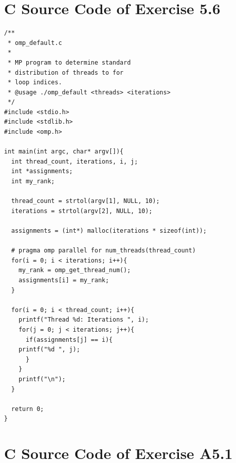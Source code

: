 \documentclass[a4paper,11pt,twoside]{article}
\begin{document}
\appendix

\section{C Source Code of Exercise 5.6}{\label{app:default}}
\begin{verbatim}
/**
 * omp_default.c
 * 
 * MP program to determine standard 
 * distribution of threads to for
 * loop indices.
 * @usage ./omp_default <threads> <iterations> 
 */
#include <stdio.h>
#include <stdlib.h>
#include <omp.h>

int main(int argc, char* argv[]){
  int thread_count, iterations, i, j;
  int *assignments;
  int my_rank;

  thread_count = strtol(argv[1], NULL, 10);
  iterations = strtol(argv[2], NULL, 10);

  assignments = (int*) malloc(iterations * sizeof(int));

  # pragma omp parallel for num_threads(thread_count)
  for(i = 0; i < iterations; i++){
    my_rank = omp_get_thread_num();
    assignments[i] = my_rank;
  }

  for(i = 0; i < thread_count; i++){
    printf("Thread %d: Iterations ", i);
    for(j = 0; j < iterations; j++){
      if(assignments[j] == i){
	printf("%d ", j);
      }
    }
    printf("\n");
  }

  return 0;
}

\end{verbatim}

\section{C Source Code of Exercise A5.1}{\label{app:histo}}
\end{document}
